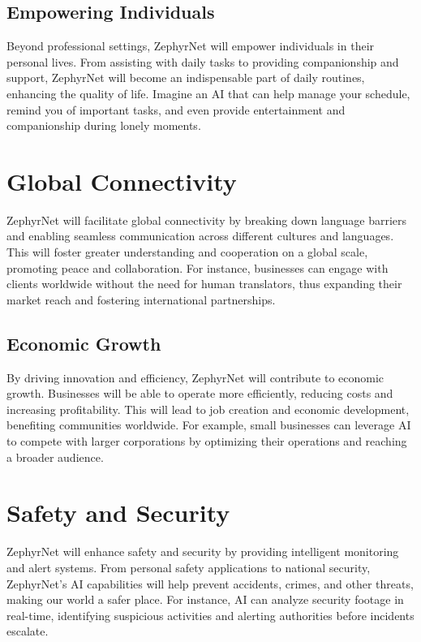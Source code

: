 \documentclass{article}
\begin{document}
	\subsection{Empowering Individuals}
	Beyond professional settings, ZephyrNet will empower individuals in their personal lives. From assisting with daily tasks to providing companionship and support, ZephyrNet will become an indispensable part of daily routines, enhancing the quality of life. Imagine an AI that can help manage your schedule, remind you of important tasks, and even provide entertainment and companionship during lonely moments.
	
	\section{Global Connectivity}
	ZephyrNet will facilitate global connectivity by breaking down language barriers and enabling seamless communication across different cultures and languages. This will foster greater understanding and cooperation on a global scale, promoting peace and collaboration. For instance, businesses can engage with clients worldwide without the need for human translators, thus expanding their market reach and fostering international partnerships.
	
	\subsection{Economic Growth}
	By driving innovation and efficiency, ZephyrNet will contribute to economic growth. Businesses will be able to operate more efficiently, reducing costs and increasing profitability. This will lead to job creation and economic development, benefiting communities worldwide. For example, small businesses can leverage AI to compete with larger corporations by optimizing their operations and reaching a broader audience.
	
	\section{Safety and Security}
	ZephyrNet will enhance safety and security by providing intelligent monitoring and alert systems. From personal safety applications to national security, ZephyrNet's AI capabilities will help prevent accidents, crimes, and other threats, making our world a safer place. For instance, AI can analyze security footage in real-time, identifying suspicious activities and alerting authorities before incidents escalate.
	
\end{document}
